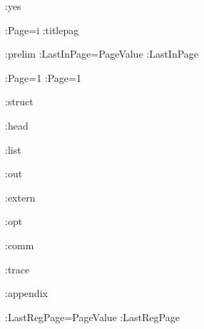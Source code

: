 %
%
%
%
%
%
\makeatletter
\makeatother
{}


%
\def\SerifFace{\TypeFace:ComputerModern }
\def\SansFace{\TypeFace:ComputerSans }




\WriteExtern:yes



\Start


\CounterRepresentation:Page=i \RightPage
\InputFile:titlepag

\InputFile:prelim
\SetCounter:LastInPage=PageValue
\BackStepCounter:LastInPage

\ToRecto\RightPage
\CounterRepresentation:Page=1 \SetCounter:Page=1

\InputFile:struct

\InputFile:head

\InputFile:list


\InputFile:out

\InputFile:extern

\InputFile:opt

\InputFile:comm

\InputFile:trace

\InputFile:appendix

\SetCounter:LastRegPage=PageValue
\BackStepCounter:LastRegPage
\Stop

